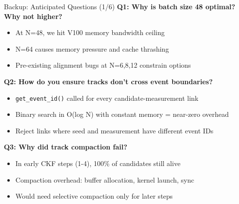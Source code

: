\documentclass[aspectratio=169, table]{beamer}
\begin{document}
\begin{frame}{Backup: Anticipated Questions (1/6)}
\textbf{Q1: Why is batch size 48 optimal? Why not higher?}
\begin{itemize}
    \item At N=48, we hit V100 memory bandwidth ceiling
    \item N=64 causes memory pressure and cache thrashing
    \item Pre-existing alignment bugs at N=6,8,12 constrain options
\end{itemize}

\vspace{0.5em}
\textbf{Q2: How do you ensure tracks don't cross event boundaries?}
\begin{itemize}
    \item \texttt{get\_event\_id()} called for every candidate-measurement link
    \item Binary search in O(log N) with constant memory = near-zero overhead
    \item Reject links where seed and measurement have different event IDs
\end{itemize}

\vspace{0.5em}
\textbf{Q3: Why did track compaction fail?}
\begin{itemize}
    \item In early CKF steps (1-4), 100\% of candidates still alive
    \item Compaction overhead: buffer allocation, kernel launch, sync
    \item Would need selective compaction only for later steps
\end{itemize}
\end{frame}
\end{document}
